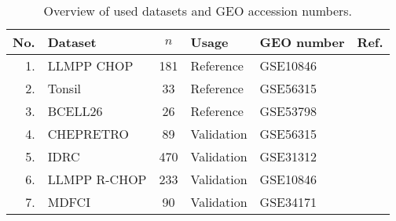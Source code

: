 \begin{table}%
\small
\caption{Overview of used datasets and GEO accession numbers.}
\label{table:01}%
\begin{center}
\begin{tabular}{rlclll}
\hline\hline
No. & Dataset & $n$ & Usage & GEO number & Ref.
\\
\hline
1. & LLMPP CHOP & 181 & Reference & GSE10846 & \citep{Lenz2008a}
\\
2. & Tonsil & 33 & Reference & GSE56315 & \citep{DybkaerBoegsted2015}
\\
3. & BCELL26 & 26 & Reference & GSE53798 & \citep{Falgreen2015}
\\
4. & CHEPRETRO & 89 & Validation & GSE56315 & \citep{DybkaerBoegsted2015}
\\
5. & IDRC & 470 & Validation & GSE31312 & \citep{Visco2012}
\\
6. & LLMPP R-CHOP & 233 & Validation & GSE10846 & \citep{Lenz2008a}
\\
7. & MDFCI & 90 & Validation & GSE34171 & \citep{Monti2012a}\\
\hline
\end{tabular}
\end{center}
\end{table}
